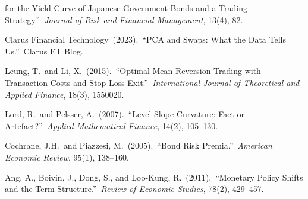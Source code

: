 \documentclass[11pt,a4paper]{article}
\begin{document}
\begin{enumerate}[label={[\arabic*]},leftmargin=*,itemsep=2pt]
        for the Yield Curve of Japanese Government Bonds and a
        Trading Strategy.''\ \textit{Journal of Risk and Financial
        Management}, 13(4), 82.
  \item Clarus Financial Technology~(2023).\ ``PCA and Swaps: What the
        Data Tells Us.''\ Clarus FT Blog.
  \item Leung, T.\ and Li, X.~(2015).\ ``Optimal Mean Reversion Trading
        with Transaction Costs and Stop-Loss Exit.''\ \textit{International
        Journal of Theoretical and Applied Finance}, 18(3), 1550020.
  \item Lord, R.\ and Pelsser, A.~(2007).\ ``Level-Slope-Curvature: Fact
        or Artefact?''\ \textit{Applied Mathematical Finance}, 14(2),
        105--130.
  \item Cochrane, J.H.\ and Piazzesi, M.~(2005).\ ``Bond Risk Premia.''\
        \textit{American Economic Review}, 95(1), 138--160.
  \item Ang, A., Boivin, J., Dong, S., and Loo-Kung, R.~(2011).\
        ``Monetary Policy Shifts and the Term Structure.''\
        \textit{Review of Economic Studies}, 78(2), 429--457.
\end{enumerate}
\end{document}
